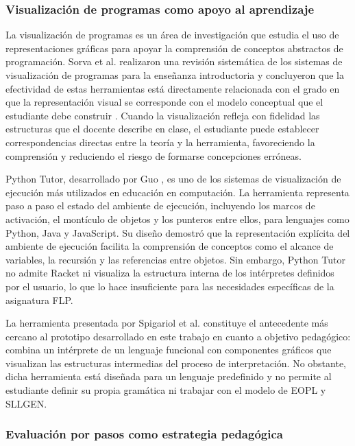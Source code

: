 \subsubsection{Visualización de programas como apoyo al aprendizaje}

La visualización de programas es un área de investigación que estudia el uso de representaciones gráficas para apoyar la comprensión de conceptos abstractos de programación. Sorva et al. realizaron una revisión sistemática de los sistemas de visualización de programas para la enseñanza introductoria y concluyeron que la efectividad de estas herramientas está directamente relacionada con el grado en que la representación visual se corresponde con el modelo conceptual que el estudiante debe construir \cite{Sorva2013}. Cuando la visualización refleja con fidelidad las estructuras que el docente describe en clase, el estudiante puede establecer correspondencias directas entre la teoría y la herramienta, favoreciendo la comprensión y reduciendo el riesgo de formarse concepciones erróneas.

Python Tutor, desarrollado por Guo \cite{Guo2013}, es uno de los sistemas de visualización de ejecución más utilizados en educación en computación. La herramienta representa paso a paso el estado del ambiente de ejecución, incluyendo los marcos de activación, el montículo de objetos y los punteros entre ellos, para lenguajes como Python, Java y JavaScript. Su diseño demostró que la representación explícita del ambiente de ejecución facilita la comprensión de conceptos como el alcance de variables, la recursión y las referencias entre objetos. Sin embargo, Python Tutor no admite Racket ni visualiza la estructura interna de los intérpretes definidos por el usuario, lo que lo hace insuficiente para las necesidades específicas de la asignatura FLP.

La herramienta presentada por Spigariol et al. \cite{Spigariol2023Aprendiendo} constituye el antecedente más cercano al prototipo desarrollado en este trabajo en cuanto a objetivo pedagógico: combina un intérprete de un lenguaje funcional con componentes gráficos que visualizan las estructuras intermedias del proceso de interpretación. No obstante, dicha herramienta está diseñada para un lenguaje predefinido y no permite al estudiante definir su propia gramática ni trabajar con el modelo de EOPL y SLLGEN.

\subsubsection{Evaluación por pasos como estrategia pedagógica}


